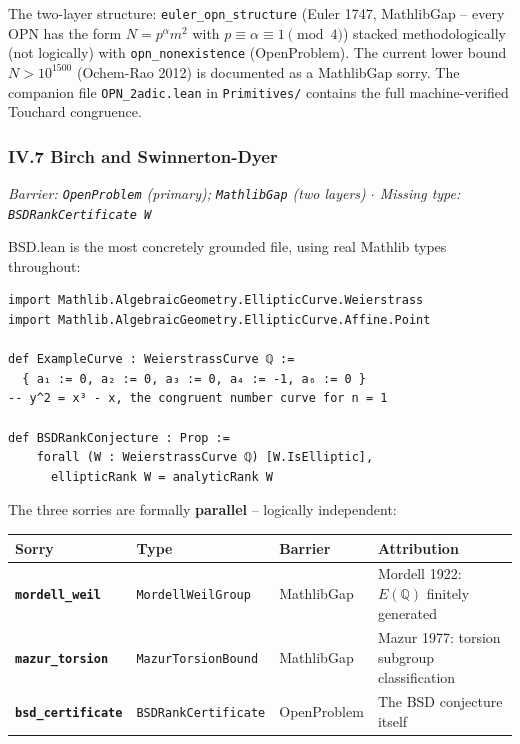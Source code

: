 \documentclass[12pt,a4paper]{article}
\begin{document}
The two-layer structure: \texttt{euler\_opn\_structure} (Euler 1747, MathlibGap  --  every OPN has the form $N = p^\alpha m^2$ with $p \equiv \alpha \equiv 1 \pmod 4$) stacked methodologically (not logically) with \texttt{opn\_nonexistence} (OpenProblem). The current lower bound $N > 10^{1500}$ (Ochem-Rao 2012) is documented as a MathlibGap sorry. The companion file \texttt{OPN\_2adic.lean} in \texttt{Primitives/} contains the full machine-verified Touchard congruence.

\subsubsection{IV.7 Birch and Swinnerton-Dyer}

\emph{Barrier: \texttt{OpenProblem} (primary); \texttt{MathlibGap} (two layers) $\cdot$ Missing type: \texttt{BSDRankCertificate W}}

BSD.lean is the most concretely grounded file, using real Mathlib types throughout:

\begin{lstlisting}[language=lean]
import Mathlib.AlgebraicGeometry.EllipticCurve.Weierstrass
import Mathlib.AlgebraicGeometry.EllipticCurve.Affine.Point

def ExampleCurve : WeierstrassCurve ℚ :=
  { a₁ := 0, a₂ := 0, a₃ := 0, a₄ := -1, a₆ := 0 }
-- y^2 = x³ - x, the congruent number curve for n = 1

def BSDRankConjecture : Prop :=
    forall (W : WeierstrassCurve ℚ) [W.IsElliptic],
      ellipticRank W = analyticRank W
\end{lstlisting}

The three sorries are formally \textbf{parallel}  --  logically independent:

\begin{table}[htbp]
\centering
\small
{}
\begin{tabularx}{\textwidth}{>{\centering\arraybackslash}X >{\centering\arraybackslash}X >{\centering\arraybackslash}X >{\centering\arraybackslash}X}
\toprule
\rowcolor{gray!25}\textbf{Sorry} & \textbf{Type} & \textbf{Barrier} & \textbf{Attribution} \\
\midrule
\rowcolors{1}{white}{gray!10}
\textbf{\texttt{mordell\_weil}} & \texttt{MordellWeilGroup} & MathlibGap & Mordell 1922: $E(\mathbb{Q})$ finitely generated \\
\textbf{\texttt{mazur\_torsion}} & \texttt{MazurTorsionBound} & MathlibGap & Mazur 1977: torsion subgroup classification \\
\textbf{\texttt{bsd\_certificate}} & \texttt{BSDRankCertificate} & OpenProblem & The BSD conjecture itself \\
\bottomrule
\end{tabularx}
\end{table}
\end{document}
